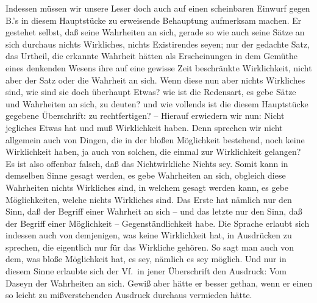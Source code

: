 Indessen müssen wir unsere Leser doch auch auf einen scheinbaren Einwurf gegen B.'s in diesem Hauptstücke zu erweisende Behauptung aufmerksam machen. Er gestehet selbst, daß seine Wahrheiten an sich, gerade so wie auch seine Sätze an sich durchaus nichts Wirkliches, nichts Existirendes seyen; nur der gedachte Satz, das Urtheil, die erkannte Wahrheit hätten als Erscheinungen in dem Gemüthe eines denkenden Wesens ihre auf eine gewisse Zeit beschränkte Wirklichkeit, nicht aber der Satz oder die Wahrheit an sich. Wenn diese nun aber nichts Wirkliches sind, wie sind sie doch überhaupt Etwas? wie ist die Redensart, es gebe Sätze und Wahrheiten an sich, zu deuten? und  wie vollends ist die diesem Hauptstücke gegebene Überschrift:  zu rechtfertigen? -- Hierauf erwiedern wir nun: Nicht jegliches Etwas hat und muß Wirklichkeit haben. Denn sprechen wir nicht allgemein auch von Dingen, die in der bloßen Möglichkeit bestehend, noch keine Wirklichkeit haben, ja auch von solchen, die einmal zur Wirklichkeit gelangen? Es ist also offenbar falsch, daß das Nichtwirkliche Nichts sey. Somit kann in demselben Sinne gesagt werden, es gebe Wahrheiten an sich, obgleich diese Wahrheiten nichts Wirkliches sind, in welchem gesagt werden kann, es gebe Möglichkeiten, welche nichts Wirkliches sind. Das Erste hat nämlich nur den Sinn, daß der Begriff einer Wahrheit an sich -- und das letzte nur den Sinn, daß der Begriff einer Möglichkeit -- Gegenständlichkeit habe. Die Sprache erlaubt sich indessen auch von demjenigen, was keine Wirklichkeit hat, in Ausdrücken zu sprechen, die eigentlich nur für das Wirkliche gehören. So sagt man auch von dem, was bloße Möglichkeit hat, es sey, nämlich es sey möglich. Und nur in diesem Sinne erlaubte sich der Vf.\ in jener Überschrift den Ausdruck: Vom Daseyn der Wahrheiten an sich. Gewiß aber hätte er besser gethan, wenn er einen so leicht zu mißverstehenden Ausdruck durchaus vermieden hätte. \par
